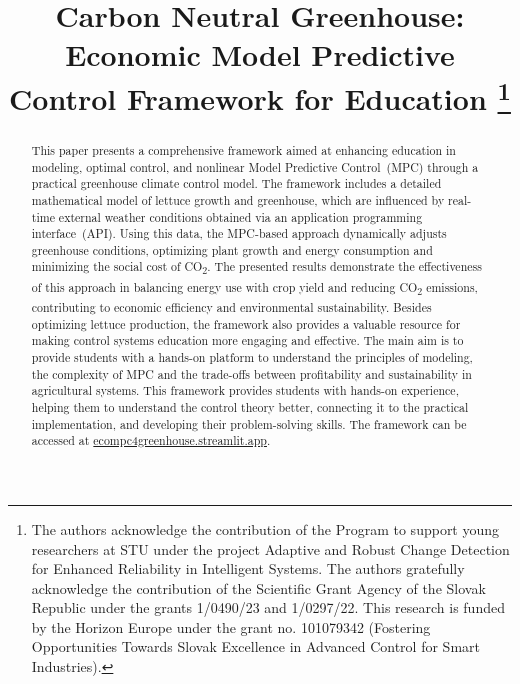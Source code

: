 \documentclass[conference]{IEEEtran}
\begin{document}
\title{Carbon Neutral Greenhouse: Economic Model Predictive Control Framework for Education
    \thanks{The authors acknowledge the contribution of the Program to support young researchers at STU under the project Adaptive and Robust Change Detection for Enhanced Reliability in Intelligent Systems. The authors gratefully acknowledge the contribution of the Scientific Grant Agency of the Slovak Republic under the grants 1/0490/23 and 1/0297/22. This research is funded by the Horizon Europe under the grant no. 101079342 (Fostering Opportunities Towards Slovak Excellence in Advanced Control for Smart Industries).}
}

\author{
}

\maketitle

\begin{abstract}
    This paper presents a comprehensive framework aimed at enhancing education in modeling, optimal control, and nonlinear Model Predictive Control~(MPC) through a practical greenhouse climate control model. The framework includes a detailed mathematical model of lettuce growth and greenhouse, which are influenced by real-time external weather conditions obtained via an application programming interface~(API). Using this data, the MPC-based approach dynamically adjusts greenhouse conditions, optimizing plant growth and energy consumption and minimizing the social cost of CO\textsubscript{2}. The presented results demonstrate the effectiveness of this approach in balancing energy use with crop yield and reducing CO\textsubscript{2} emissions, contributing to economic efficiency and environmental sustainability.
    Besides optimizing lettuce production, the framework also provides a valuable resource for making control systems education more engaging and effective. The main aim is to provide students with a hands-on platform to understand the principles of modeling, the complexity of MPC and the trade-offs between profitability and sustainability in agricultural systems. This framework provides students with hands-on experience, helping them to understand the control theory better, connecting it to the practical implementation, and developing their problem-solving skills. The framework can be accessed at \url{ecompc4greenhouse.streamlit.app}.
\end{abstract}
\end{document}
